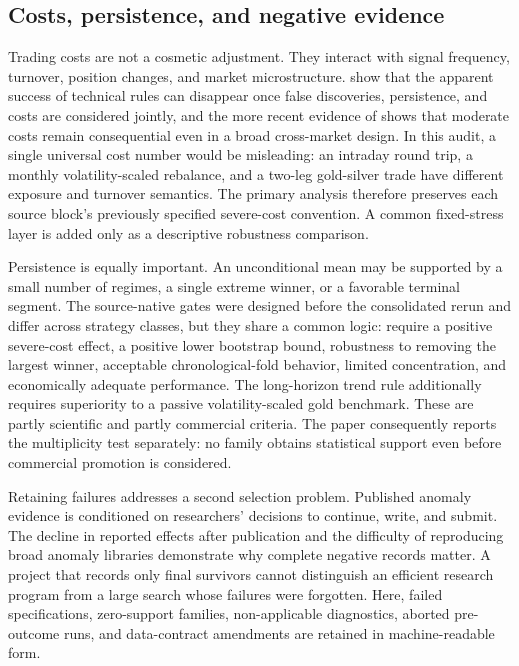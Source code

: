 \subsection{Costs, persistence, and negative evidence}

Trading costs are not a cosmetic adjustment. They interact with signal frequency, turnover, position changes, and market microstructure. \citet{bajgrowicz2012} show that the apparent success of technical rules can disappear once false discoveries, persistence, and costs are considered jointly, and the more recent evidence of \citet{rink2023} shows that moderate costs remain consequential even in a broad cross-market design. In this audit, a single universal cost number would be misleading: an intraday round trip, a monthly volatility-scaled rebalance, and a two-leg gold-silver trade have different exposure and turnover semantics. The primary analysis therefore preserves each source block's previously specified severe-cost convention. A common fixed-stress layer is added only as a descriptive robustness comparison.

Persistence is equally important. An unconditional mean may be supported by a small number of regimes, a single extreme winner, or a favorable terminal segment. The source-native gates were designed before the consolidated rerun and differ across strategy classes, but they share a common logic: require a positive severe-cost effect, a positive lower bootstrap bound, robustness to removing the largest winner, acceptable chronological-fold behavior, limited concentration, and economically adequate performance. The long-horizon trend rule additionally requires superiority to a passive volatility-scaled gold benchmark. These are partly scientific and partly commercial criteria. The paper consequently reports the multiplicity test separately: no family obtains statistical support even before commercial promotion is considered.

Retaining failures addresses a second selection problem. Published anomaly evidence is conditioned on researchers' decisions to continue, write, and submit. The decline in reported effects after publication \citep{mclean2016} and the difficulty of reproducing broad anomaly libraries \citep{hou2020} demonstrate why complete negative records matter. A project that records only final survivors cannot distinguish an efficient research program from a large search whose failures were forgotten. Here, failed specifications, zero-support families, non-applicable diagnostics, aborted pre-outcome runs, and data-contract amendments are retained in machine-readable form.

